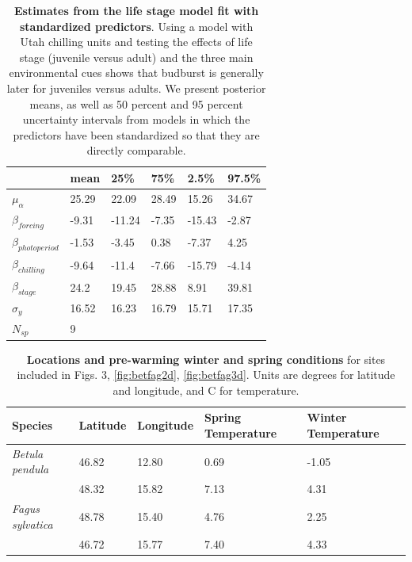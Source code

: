 \documentclass{article}
\begin{document}
\begin{footnotesize}
\begin{table}[ht]
\centering
\caption{\textbf{Estimates from the life stage model fit with standardized predictors}. Using a model with Utah chilling units and testing the effects of life stage (juvenile versus adult) and the three main environmental cues shows that budburst is generally later for juveniles versus adults. We present posterior means, as well as 50 percent and 95 percent uncertainty intervals from models in which the predictors have been standardized so that they are directly comparable.} 
\label{tab:stage}
\begingroup\footnotesize
\begin{tabular}{|p{}|p{}p{}p{}p{}p{}|}
  \hline
 & mean & 25\% & 75\% & 2.5\% & 97.5\% \\ 
  \hline
$\mu_{\alpha}$ & 25.29 & 22.09 & 28.49 & 15.26 & 34.67 \\ 
  $\beta_{forcing}$ & -9.31 & -11.24 & -7.35 & -15.43 & -2.87 \\ 
  $\beta_{photoperiod}$ & -1.53 & -3.45 & 0.38 & -7.37 & 4.25 \\ 
  $\beta_{chilling}$ & -9.64 & -11.4 & -7.66 & -15.79 & -4.14 \\ 
  $\beta_{stage}$ & 24.2 & 19.45 & 28.88 & 8.91 & 39.81 \\ 
  $\sigma_{y}$ & 16.52 & 16.23 & 16.79 & 15.71 & 17.35 \\ 
   \hline
$N_{sp}$ & 9 &  &  &  &  \\ 
   \hline
\end{tabular}
\endgroup
\end{table}

\begin{table}[ht]
\centering
\caption{\textbf{Locations and pre-warming winter and spring conditions} for sites included in Figs. 3, \ref{fig:betfag2d}, \ref{fig:betfag3d}. Units are degrees for latitude and longitude, and \degree C for temperature. } 
\label{tab:clim}
\begingroup\footnotesize
\begin{tabular}{|p{}|p{}|p{}|p{}|p{}|}
  \hline
Species & Latitude & Longitude & Spring Temperature & Winter Temperature \\ 
  \hline
\textit{Betula pendula} & 46.82 & 12.80 & 0.69 & -1.05 \\ 
  \textit{} & 48.32 & 15.82 & 7.13 & 4.31 \\ 
  \textit{Fagus sylvatica} & 48.78 & 15.40 & 4.76 & 2.25 \\ 
  \textit{} & 46.72 & 15.77 & 7.40 & 4.33 \\ 
   \hline
\end{tabular}
\endgroup
\end{table}



\end{footnotesize}
\end{document}
